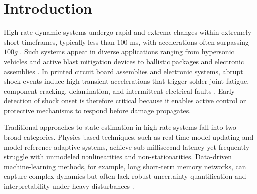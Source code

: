 \documentclass[colorlinks,upint,subscriptcorrection,varvw,hyphenate,balance,greek,russian,vietnamese,german]{asmeconf} %
\begin{document}

%
%
%


\section{Introduction}

High-rate dynamic systems undergo rapid and extreme changes within extremely short timeframes, typically less than 100 ms, with accelerations often surpassing \(100g\) \cite{Chua2025Probabilisticmachinelearning}. Such systems appear in diverse applications ranging from hypersonic vehicles and active blast mitigation devices to ballistic packages and electronic assemblies \cite{Razmarashooli2025Realtimestate}. In printed circuit board assemblies and electronic systems, abrupt shock events induce high transient accelerations that trigger solder-joint fatigue, component cracking, delamination, and intermittent electrical faults \cite{Zhou2023FailureAnalysisPrinted}. Early detection of shock onset is therefore critical because it enables active control or protective mechanisms to respond before damage propagates.

Traditional approaches to state estimation in high-rate systems fall into two broad categories. Physics-based techniques, such as real-time model updating and model-reference adaptive systems, achieve sub-millisecond latency yet frequently struggle with unmodeled nonlinearities and non-stationarities. Data-driven machine-learning methods, for example, long short-term memory networks, can capture complex dynamics but often lack robust uncertainty quantification and interpretability under heavy disturbances \cite{Yan2021Onlineparameterestimation}.
\end{document}
